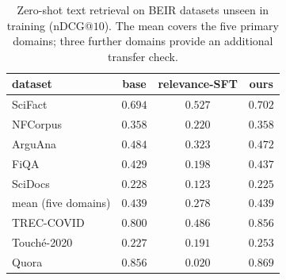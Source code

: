 \begin{table}[H]
\centering\small
\caption{Zero-shot text retrieval on BEIR datasets unseen in training (nDCG@$10$). The mean
covers the five primary domains; three further domains provide an additional transfer check.}
\label{tab:rag_ood_text_beir}
\begin{tabular}{lccc}
\toprule
dataset & base & relevance-SFT & ours \\
\midrule
SciFact & $0.694$ & $0.527$ & $0.702$ \\
NFCorpus & $0.358$ & $0.220$ & $0.358$ \\
ArguAna & $0.484$ & $0.323$ & $0.472$ \\
FiQA & $0.429$ & $0.198$ & $0.437$ \\
SciDocs & $0.228$ & $0.123$ & $0.225$ \\
\midrule
mean (five domains) & $0.439$ & $0.278$ & $0.439$ \\
\midrule
TREC-COVID & $0.800$ & $0.486$ & $0.856$ \\
Touch\'e-2020 & $0.227$ & $0.191$ & $0.253$ \\
Quora & $0.856$ & $0.020$ & $0.869$ \\
\bottomrule
\end{tabular}
\end{table}
